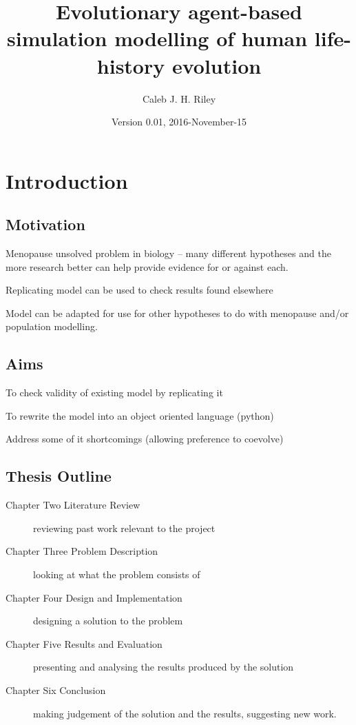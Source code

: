 \documentclass[authoryearcitations]{UoYCSproject}
\author{Caleb J. H. Riley}
\title{Evolutionary agent-based simulation modelling of human life-history evolution}
\date{Version 0.01, 2016-November-15}
\begin{document}
\maketitle
\listoffigures
\listoftables

\cleardoublepage

\chapter{Introduction}
\label{cha:Introduction}
\section{Motivation}
Menopause unsolved problem in biology -- many different hypotheses and the more research better can help provide evidence for or against each.

Replicating model can be used to check results found elsewhere

Model can be adapted for use for other hypotheses to do with menopause and/or population modelling.

\section{Aims}
To check validity of existing model by replicating it

To rewrite the model into an object oriented language (python)

Address some of it shortcomings (allowing preference to coevolve)

\section{Thesis Outline}
\begin{description}

\item[Chapter Two Literature Review] reviewing past work relevant to the project

\item[Chapter Three Problem Description] looking at what the problem consists of

\item[Chapter Four Design and Implementation] designing a solution to the problem

\item[Chapter Five Results and Evaluation] presenting and analysing the results produced by the solution

\item[Chapter Six Conclusion] making judgement of the solution and the results, suggesting new work.

\end{description}
\end{document}
